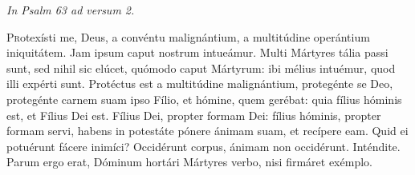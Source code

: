 
{\hfill \textit{In Psalm 63 ad versum 2.}}

\lettrine{P}{r}otexísti me, Deus, a convéntu malignántium, a multitúdine operántium iniquitátem. Jam ipsum caput nostrum intueámur. Multi Mártyres tália passi sunt, sed nihil sic elúcet, quómodo caput Mártyrum: ibi mélius intuémur, quod illi expérti sunt. Protéctus est a multitúdine malignántium, protegénte se Deo, protegénte carnem suam ipso Fílio, et hómine, quem gerébat: quia fílius hóminis est, et Fílius Dei est. Fílius Dei, propter formam Dei: fílius hóminis, propter formam servi, habens in potestáte pónere ánimam suam, et recípere eam. Quid ei potuérunt fácere inimíci? Occidérunt corpus, ánimam non occidérunt. Inténdite. Parum ergo erat, Dóminum hortári Mártyres verbo, nisi firmáret exémplo.